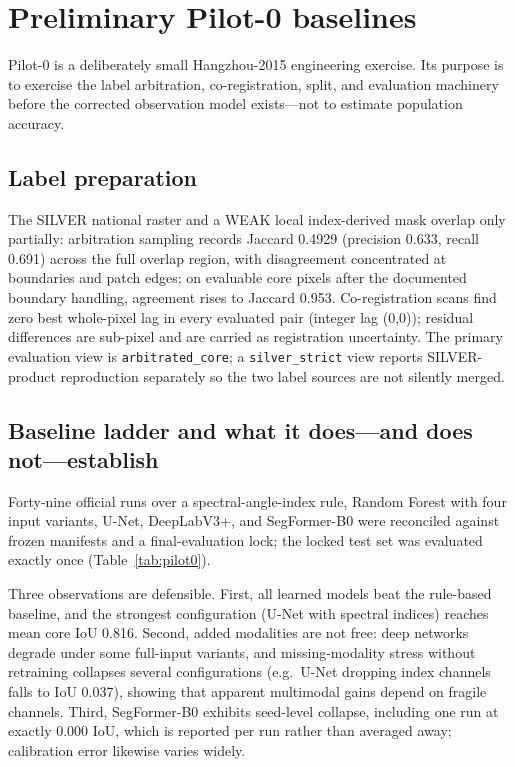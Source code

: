 \section{Preliminary Pilot-0 baselines}\label{sec:baselines}

Pilot-0 is a deliberately small Hangzhou-2015 engineering exercise. Its
purpose is to exercise the label arbitration, co-registration, split,
and evaluation machinery before the corrected observation model
exists---not to estimate population accuracy.

\subsection{Label preparation}
The SILVER national raster and a WEAK local index-derived mask overlap
only partially: arbitration sampling records Jaccard 0.4929 (precision
0.633, recall 0.691) across the full overlap region, with disagreement
concentrated at boundaries and patch edges; on evaluable core pixels
after the documented boundary handling, agreement rises to Jaccard
0.953. Co-registration scans find zero best whole-pixel lag in every
evaluated pair (integer lag (0,0)); residual differences are sub-pixel
and are carried as registration uncertainty. The primary evaluation view
is \texttt{arbitrated\_core}; a \texttt{silver\_strict} view reports
SILVER-product reproduction separately so the two label sources are not
silently merged.

\subsection{Baseline ladder and what it does---and does not---establish}
Forty-nine official runs over a spectral-angle-index rule, Random
Forest with four input variants, U-Net, DeepLabV3+, and SegFormer-B0
were reconciled against frozen manifests and a final-evaluation lock;
the locked test set was evaluated exactly once (Table~\ref{tab:pilot0}).



Three observations are defensible. First, all learned models beat the
rule-based baseline, and the strongest configuration (U-Net with
spectral indices) reaches mean core IoU 0.816. Second, added modalities
are not free: deep networks degrade under some full-input variants,
and missing-modality stress without retraining collapses several
configurations (e.g.\ U-Net dropping index channels falls to IoU
0.037), showing that apparent multimodal gains depend on fragile
channels. Third, SegFormer-B0 exhibits seed-level collapse, including
one run at exactly 0.000 IoU, which is reported per run rather than
averaged away; calibration error likewise varies widely.

